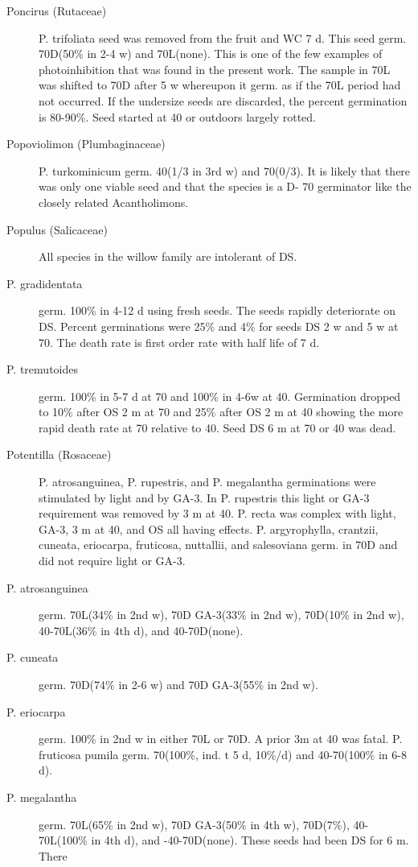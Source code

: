 \begin{description}
\item[Poncirus (Rutaceae)] P. trifoliata seed was removed from the fruit and WC 7
d. This seed germ. 70D(50\% in 2-4 w) and 70L(none). This is one of the few
examples of photoinhibition that was found in the present work. The sample in 70L
was shifted to 70D after 5 w whereupon it germ. as if the 70L period had not occurred.
If the undersize seeds are discarded, the percent germination is 80-90\%. Seed started
at 40 or outdoors largely rotted.

\item[Popoviolimon (Plumbaginaceae)] P. turkominicum germ. 40(1/3 in 3rd w)
and 70(0/3). It is likely that there was only one viable seed and that the species is a D-
70 germinator like the closely related Acantholimons.

\item[Populus (Salicaceae)] All species in the willow family are intolerant of DS.
\item[P. gradidentata] germ. 100\% in 4-12 d using fresh seeds. The seeds rapidly
deteriorate on DS. Percent germinations were 25\% and 4\% for seeds DS 2 w and 5 w
at 70. The death rate is first order rate with half life of 7 d.
\item[P. tremutoides] germ. 100\% in 5-7 d at 70 and 100\% in 4-6w at 40. Germination
dropped to 10\% after OS 2 m at 70 and 25\% after OS 2 m at 40 showing the more
rapid death rate at 70 relative to 40. Seed DS 6 m at 70 or 40 was dead.
\item[Potentilla (Rosaceae)] P. atrosanguinea, P. rupestris, and P. megalantha
germinations were stimulated by light and by GA-3. In P. rupestris this light or GA-3
requirement was removed by 3 m at 40. P. recta was complex with light, GA-3, 3 m at
40, and OS all having effects. P. argyrophylla, crantzii, cuneata, eriocarpa, fruticosa,
nuttallii, and salesoviana germ. in 70D and did not require light or GA-3.
\item[P. atrosanguinea] germ. 70L(34\% in 2nd w), 70D GA-3(33\% in 2nd w),
70D(10\% in 2nd w), 40-70L(36\% in 4th d), and 40-70D(none).
\item[P. cuneata] germ. 70D(74\% in 2-6 w) and 70D GA-3(55\% in 2nd w).
\item[P. eriocarpa] germ. 100\% in 2nd w in either 70L or 70D. A prior 3m at 40 was
fatal. P. fruticosa pumila germ. 70(100\%, ind. t 5 d, 10\%/d) and 40-70(100\% in 6-8 d).
\item[P. megalantha] germ. 70L(65\% in 2nd w), 70D GA-3(50\% in 4th w), 70D(7\%), 40-
70L(100\% in 4th d), and -40-70D(none). These seeds had been DS for 6 m. There

\end{description}
